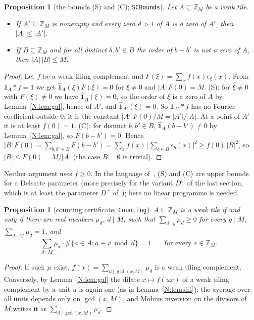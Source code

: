 \documentclass[11pt,a4paper]{amsart}
\newtheorem{proposition}[theorem]{Proposition}
\theoremstyle{definition}
\theoremstyle{remark}
\newcommand{\Z}{\mathbb{Z}}
\newcommand{\one}{\mathbf{1}}
\newcommand{\lean}[1]{\texttt{#1}}
\begin{document}
\begin{proposition}[the bounds (S) and (C); \lean{SCBounds}]\label{N:prop:SC}
Let $A\subseteq\Z_M$ be a weak tile.
\begin{itemize}
\item[\textup{(S)}] If $A'\subseteq\Z_M$ is nonempty and every zero $d>1$ of $A$ is a zero of $A'$, then $|A|\le|A'|$.
\item[\textup{(C)}] If $B\subseteq\Z_M$ and for all distinct $b,b'\in B$ the order of $b-b'$ is not a zero of $A$, then
 $|A|\,|B|\le M$.
\end{itemize}
\end{proposition}
\begin{proof}
Let $f$ be a weak tiling complement and $F(\xi)=\sum_xf(x)e_\xi(x)$. From $\one_A*f=1$ we get
$\hat{\one}_A(\xi)F(\xi)=0$ for $\xi\ne0$ and $|A|\,F(0)=M$. (S): for $\xi\ne 0$ with $F(\xi)\ne0$ we have
$\hat{\one}_A(\xi)=0$, so the order of $\xi$ is a zero of $A$ by Lemma~\ref{N:lem:gal}, hence of $A'$, and
$\hat{\one}_{A'}(\xi)=0$. So $\one_{A'}*f$ has no Fourier coefficient outside $0$: it is the constant
$|A'|F(0)/M=|A'|/|A|$. At a point of $A'$ it is at least $f(0)=1$. (C): for distinct $b,b'\in B$,
$\hat{\one}_A(b-b')\ne0$ by Lemma~\ref{N:lem:gal}, so $F(b-b')=0$. Hence
$|B|\,F(0)=\sum_{b,b'\in B}F(b-b')=\sum_xf(x)\,\bigl|\sum_{b\in B}e_b(x)\bigr|^2\ge f(0)\,|B|^2$, so
$|B|\le F(0)=M/|A|$ (the case $B=\emptyset$ is trivial).
\end{proof}

Neither argument uses $\hat f\ge 0$. In the language of~\cite{KLMS}, (S) and (C) are upper bounds for a Delsarte
parameter (more precisely for the variant $D^w$ of the last section, which is at least the parameter $D^+$
of~\cite{KLMS}); here no linear programme is needed.

\begin{proposition}[counting certificate; \lean{Counting}]\label{N:prop:cert}
$A\subseteq\Z_M$ is a weak tile if and only if there are real numbers $\mu_d$, $d\mid M$, such that
$\sum_{d\mid g}\mu_d\ge0$ for every $g\mid M$, $\sum_{d\mid M}\mu_d=1$, and
\[
 \sum_{d\mid M}\mu_d\cdot\#\{a\in A: a\equiv v \bmod d\}=1\qquad\text{for every } v\in\Z_M .
\]
\end{proposition}
\begin{proof}
If such $\mu$ exist, $f(x)=\sum_{d\mid\gcd(x,M)}\mu_d$ is a weak tiling complement. Conversely, by
Lemma~\ref{N:lem:gal} the dilate $x\mapsto f(ux)$ of a weak tiling complement by a unit $u$ is again one (as in
Lemma~\ref{N:lem:dil}); the average over all units depends only on $\gcd(x,M)$, and M\"obius inversion on the
divisors of $M$ writes it as $\sum_{d\mid\gcd(x,M)}\mu_d$.
\end{proof}
\end{document}
